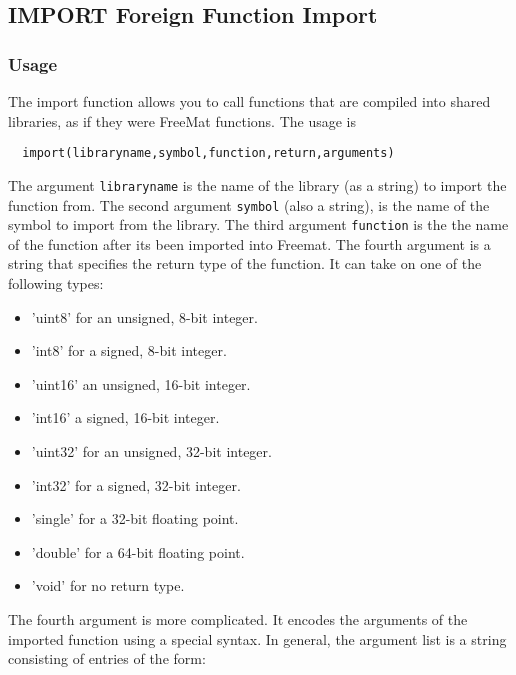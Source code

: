 %
%
%
\subsection{IMPORT Foreign Function Import}
\subsubsection{Usage}
The import function allows you to call functions that are compiled into
shared libraries, as if they were FreeMat functions. The usage is
\begin{verbatim}
  import(libraryname,symbol,function,return,arguments)
\end{verbatim}
The argument \verb|libraryname| is the name of the library (as a string)
to import the function from.  The second argument \verb|symbol| (also
a string), is the name of the symbol to import from the library.  The
third argument \verb|function| is the the name of the function after its
been imported into Freemat.  The fourth argument is a string that
specifies the return type of the function. It can take on one of the 
following types:
\begin{itemize}
\item 'uint8' for an unsigned, 8-bit integer.
\item 'int8' for a signed, 8-bit integer.
\item 'uint16' an unsigned, 16-bit  integer.
\item 'int16' a signed, 16-bit integer.
\item 'uint32' for an unsigned, 32-bit integer.
\item 'int32' for a signed, 32-bit integer.
\item 'single' for a 32-bit floating point.
\item 'double' for a 64-bit floating point.
\item 'void' for no return type.
\end{itemize}
The fourth argument is more complicated.  It encodes the arguments of the
imported function using a special syntax.  In general, the argument list
is a string consisting of entries of the form:

